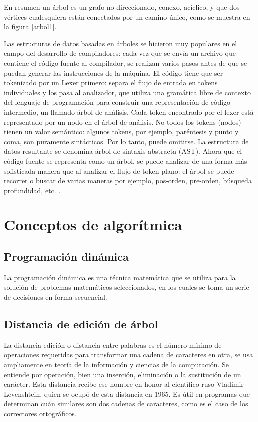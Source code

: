 En resumen un árbol es un grafo no direccionado, conexo, acíclico, y que dos vértices cualesquiera están conectados por un camino único, como se muestra en la figura \ref{arbol1}.

Las estructuras de datos basadas en árboles se hicieron muy populares en el campo del desarrollo de compiladores: cada vez que se envía un archivo que contiene el código fuente al compilador, se realizan varios pasos antes de que se puedan generar las instrucciones de la máquina. El código tiene que ser tokenizado por un Lexer primero: separa el flujo de entrada en tokens individuales y los pasa al analizador, que utiliza una gramática libre de contexto del lenguaje de programación para construir una representación de código intermedio, un llamado árbol de análisis.
Cada token encontrado por el lexer está representado por un nodo en el árbol de análisis. No todos los tokens (nodos) tienen un valor semántico: algunos tokens, por ejemplo, paréntesis y punto y coma, son puramente sintácticos. Por lo tanto, puede omitirse. La estructura de datos resultante se denomina árbol de sintaxis abstracta (AST).
Ahora que el código fuente se representa como un árbol, se puede analizar de una forma más sofisticada manera que al analizar el flujo de token plano: el árbol se puede recorrer o buscar de varias maneras por ejemplo, pos-orden, pre-orden, búsqueda profundidad, etc. \cite{ChangeDistiller}.

\section{Conceptos de algorítmica}

\subsection{Programación dinámica}
La programación dinámica es una técnica matemática que se utiliza para la solución de problemas matemáticos seleccionados, en los cuales se toma un serie de decisiones en forma secuencial.

\subsection{Distancia de edición de árbol}
La distancia edición o distancia entre palabras es el número mínimo de operaciones requeridas para transformar una cadena de caracteres en otra, se usa ampliamente en teoría de la información y ciencias de la computación. Se entiende por operación, bien una inserción, eliminación o la sustitución de un carácter. Esta distancia recibe ese nombre en honor al científico ruso Vladimir Levenshtein, quien se ocupó de esta distancia en 1965. Es útil en programas que determinan cuán similares son dos cadenas de caracteres, como es el caso de los correctores ortográficos.\\

